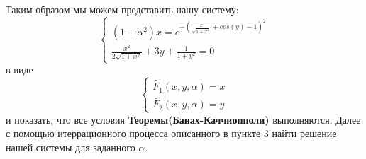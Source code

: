 \documentclass[a4paper, fontsize=14pt]{article}
\begin{document}
	Таким образом мы можем представить нашу систему:
	\begin{equation*}
	    \begin{cases}
	        (1+\alpha^2)x = e^{-(\frac{x}{\sqrt{1+x^2}} + cos(y) -1)^2}\\
		\frac{x^2}{2\sqrt{1+x^2}} +3y + \frac{1}{1+y^2} = 0
		\end{cases}
	\end{equation*}
	в виде
	\begin{equation*}
	    \begin{cases}
	        \widetilde{F_1}(x,y,\alpha) = x\\
		\widetilde{F_2}(x,y,\alpha) = y
		\end{cases}
	\end{equation*}
	и показать, что все условия \textbf{Теоремы(Банах-Каччиопполи)} выполняются. Далее с помощью итеррационного процесса описанного в пункте 3 найти решение нашей системы для заданного $\alpha$.

    \newpage
\end{document}
